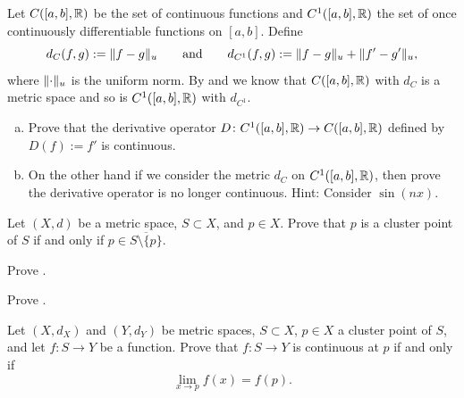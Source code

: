 \begin{samepage}
\begin{exercise}
Let $C([a,b],{\mathbb{R}})$ be the set of continuous functions and
$C^1([a,b],{\mathbb{R}})$ the set of once continuously differentiable
functions on $[a,b]$.
Define
\begin{equation*}
d_{C}(f,g) := \lVert {f-g} \rVert_u
\qquad \text{and} \qquad
d_{C^1}(f,g) := \lVert {f-g} \rVert_u + \lVert {f'-g'} \rVert_u,
\end{equation*}
where $\lVert {\cdot} \rVert_u$ is the uniform norm.
By  and  we know that
$C([a,b],{\mathbb{R}})$ with $d_C$ is a metric space and
so is
$C^1([a,b],{\mathbb{R}})$ with $d_{C^1}$.
\begin{enumerate}[a)]
\item
Prove that the derivative operator $D \colon 
C^1([a,b],{\mathbb{R}}) \to C([a,b],{\mathbb{R}})$ defined by
$D(f) := f'$ is continuous.
\item
On the other hand if we consider the metric $d_C$ on $C^1([a,b],{\mathbb{R}})$,
then prove the derivative operator is no longer continuous.  Hint: Consider
$\sin(n x)$.
\end{enumerate}
\end{exercise}
\end{samepage}

\begin{exercise}
Let $(X,d)$ be a metric space, $S \subset X$, and $p \in X$.  Prove that
$p$ is a cluster point of $S$ if and only if $p \in \overline{S \setminus \{
p \}}$.
\end{exercise}

\begin{exercise}
Prove .
\end{exercise}

\begin{exercise}
Prove .
\end{exercise}

\begin{exercise}
Let $(X,d_X)$ and $(Y,d_Y)$ be metric spaces, $S \subset X$, $p \in X$
a cluster point of $S$, and let $f \colon S \to Y$ be a function.
Prove that
$f \colon S \to Y$ is continuous at $p$ if and only if
\begin{equation*}
\lim_{x \to p} f(x) = f(p) .
\end{equation*}
\end{exercise}

